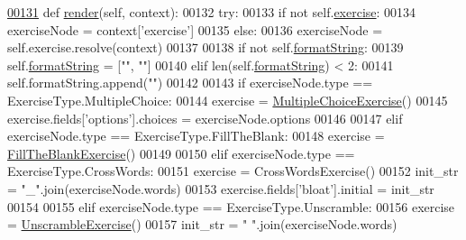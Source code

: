 \begin{DoxyCode}
{{{{{{{{{{{{{{{{{{{\hypertarget{exercises_8py_source_l00131}{}\hyperlink{classCourse_1_1templatetags_1_1exercises_1_1ExerciseToken_af53c156486c9175af84cd003285aa95e}{00131}     \textcolor{keyword}{def }\hyperlink{classCourse_1_1templatetags_1_1exercises_1_1ExerciseToken_af53c156486c9175af84cd003285aa95e}{render}(self, context):
00132         \textcolor{keywordflow}{try}:
00133             \textcolor{keywordflow}{if} \textcolor{keywordflow}{not} self.\hyperlink{classCourse_1_1templatetags_1_1exercises_1_1ExerciseToken_a7051cf9758ec633ad62d57161d73c852}{exercise}:
00134                 exerciseNode = context[\textcolor{stringliteral}{'exercise'}]
00135             \textcolor{keywordflow}{else}:
00136                 exerciseNode = self.exercise.resolve(context)
00137 
00138             \textcolor{keywordflow}{if} \textcolor{keywordflow}{not} self.\hyperlink{classCourse_1_1templatetags_1_1exercises_1_1ExerciseToken_ae15b200ce6e26966169799ea67b67bcd}{formatString}:
00139                 self.\hyperlink{classCourse_1_1templatetags_1_1exercises_1_1ExerciseToken_ae15b200ce6e26966169799ea67b67bcd}{formatString} = [\textcolor{stringliteral}{""}, \textcolor{stringliteral}{""}]
00140             \textcolor{keywordflow}{elif} len(self.\hyperlink{classCourse_1_1templatetags_1_1exercises_1_1ExerciseToken_ae15b200ce6e26966169799ea67b67bcd}{formatString}) < 2:
00141                 self.formatString.append(\textcolor{stringliteral}{""})
00142 
00143             \textcolor{keywordflow}{if} exerciseNode.type == ExerciseType.MultipleChoice:
00144                 exercise = \hyperlink{classCourse_1_1forms_1_1MultipleChoiceExercise}{MultipleChoiceExercise}()
00145                 exercise.fields[\textcolor{stringliteral}{'options'}].choices = exerciseNode.options
00146 
00147             \textcolor{keywordflow}{elif} exerciseNode.type == ExerciseType.FillTheBlank:
00148                 exercise = \hyperlink{classCourse_1_1forms_1_1FillTheBlankExercise}{FillTheBlankExercise}()
00149 
00150             \textcolor{keywordflow}{elif} exerciseNode.type == ExerciseType.CrossWords:
00151                 exercise = CrossWordsExercise()
00152                 init\_str = \textcolor{stringliteral}{"\_"}.join(exerciseNode.words)
00153                 exercise.fields[\textcolor{stringliteral}{'bloat'}].initial = init\_str
00154 
00155             \textcolor{keywordflow}{elif} exerciseNode.type == ExerciseType.Unscramble:
00156                 exercise = \hyperlink{classCourse_1_1forms_1_1UnscrambleExercise}{UnscrambleExercise}()
00157                 init\_str = \textcolor{stringliteral}{" "}.join(exerciseNode.words)
}}}}}}}}}}}}}}}}}}}
\end{DoxyCode}
